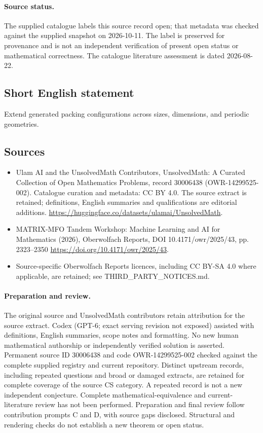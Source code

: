 \documentclass[11pt]{article}
\begin{document}
\paragraph{Source status.}
The supplied catalogue labels this source record open; that metadata was checked against the supplied snapshot on 2026-10-11. The label is preserved for provenance and is not an independent verification of present open status or mathematical correctness. The catalogue literature assessment is dated 2026-08-22.
\subsection{Short English statement}
Extend generated packing configurations across sizes, dimensions, and periodic geometries.
\subsection{Sources}
\begin{itemize}
\item[S1] Ulam AI and the UnsolvedMath Contributors, UnsolvedMath: A Curated Collection of Open Mathematics Problems, record 30006438 (OWR-14299525-002). Catalogue curation and metadata: CC BY 4.0. The source extract is retained; definitions, English summaries and qualifications are editorial additions.
\url{https://huggingface.co/datasets/ulamai/UnsolvedMath}.
\item[S2] MATRIX-MFO Tandem Workshop: Machine Learning and AI for Mathematics (2026), Oberwolfach Reports, DOI 10.4171/owr/2025/43, pp. 2323--2350
\url{https://doi.org/10.4171/owr/2025/43}.
\item Source-specific Oberwolfach Reports licences, including CC BY-SA 4.0 where applicable, are retained; see THIRD\_PARTY\_NOTICES.md.
\end{itemize}
\paragraph{Preparation and review.}
The original source and UnsolvedMath contributors retain attribution for the source extract. Codex (GPT-6; exact serving revision not exposed) assisted with definitions, English summaries, scope notes and formatting. No new human mathematical authorship or independently verified solution is asserted. Permanent source ID 30006438 and code OWR-14299525-002 checked against the complete supplied registry and current repository. Distinct upstream records, including repeated questions and broad or damaged extracts, are retained for complete coverage of the source CS category. A repeated record is not a new independent conjecture. Complete mathematical-equivalence and current-literature review has not been performed. Preparation and final review follow contribution prompts C and D, with source gaps disclosed. Structural and rendering checks do not establish a new theorem or open status.
\label{end:30006438}
\end{document}
